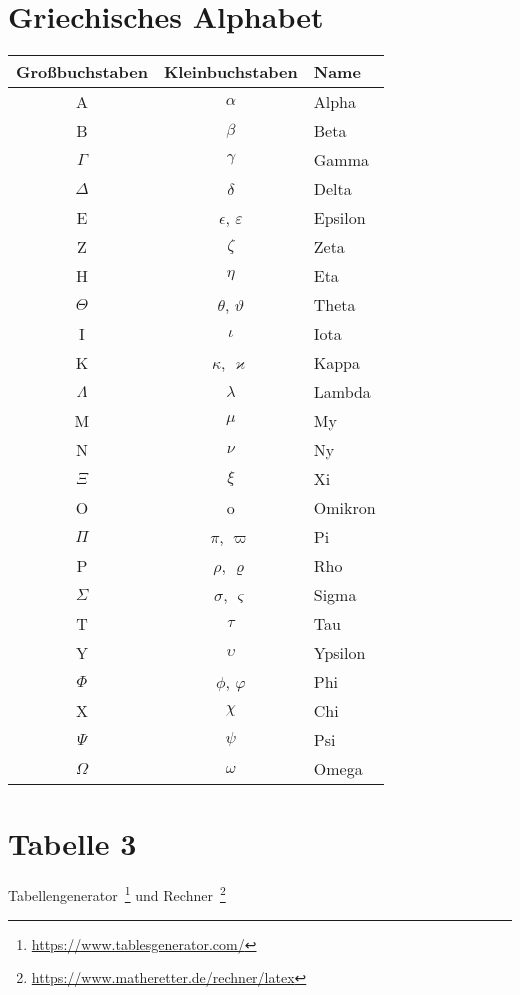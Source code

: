 \section{Griechisches Alphabet}
    \begin{table}[!ht]%
        \begin{tabular}{@{}ccl@{}}
        \toprule 
        \textbf{Großbuchstaben} & \textbf{Kleinbuchstaben} & \textbf{Name}\\
        \midrule
        A & $\alpha$ & Alpha\\
        B & $\beta$ & Beta\\
        $\Gamma$ & $\gamma$ & Gamma \\
        $\Delta$ & $\delta$ & Delta\\
        E & $\epsilon$, $\varepsilon$ & Epsilon\\
        Z & $\zeta$ & Zeta\\
        H & $\eta$ & Eta\\
        $\Theta$ & $\theta$, $\vartheta$ & Theta\\
        I & $\iota$ & Iota\\
        K & $\kappa$, $\varkappa$ & Kappa\\
        $\Lambda$ & $\lambda$ & Lambda\\
        M & $\mu$ & My\\
        N & $\nu$ & Ny\\
        $\Xi$ & $\xi$ & Xi\\
        O & o & Omikron\\
        $\Pi$ & $\pi$, $\varpi$ & Pi\\
        P & $\rho$, $\varrho$ & Rho\\
        $\Sigma$ & $\sigma$, $\varsigma$ & Sigma\\
        T & $\tau$ & Tau\\
        Y & $\upsilon$ & Ypsilon\\
        $\Phi$ & $\phi$, $\varphi$ & Phi\\
        X & $\chi$ & Chi\\
        $\Psi$ & $\psi$ & Psi\\
        $\Omega$ & $\omega$ & Omega\\
        \bottomrule
        \end{tabular}
    \end{table}

\section{Tabelle 3}
    Tabellengenerator~\footnote{\url{https://www.tablesgenerator.com/}} 
    und Rechner~\footnote{\url{https://www.matheretter.de/rechner/latex}}

